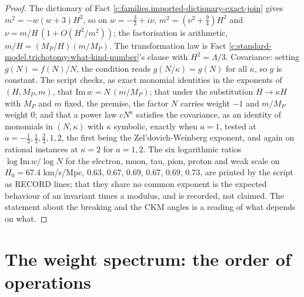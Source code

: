 \documentclass[11pt]{article}
\theoremstyle{definition}
\theoremstyle{plain}
\begin{document}
\begin{proof}
The dictionary of Fact \ref{c:families.imported-dictionary-exact-join} gives $m^{2} = -w(w+3)H^{2}$, so on $w = -\tfrac32 + i\nu$, $m^{2} = (\nu^{2} + \tfrac94)H^{2}$ and $\nu = m/H\,(1 + O(H^{2}/m^{2}))$; the factorisation is arithmetic, $m/H = (M_{P}/H)(m/M_{P})$. The transformation law is Fact \ref{c:standard-model.trichotomy-what-kind-number}'s clause with $H^{2} = \Lambda/3$. Covariance: setting $g(N) = f(N)/N$, the condition reads $g(N/\kappa) = g(N)$ for all $\kappa$, so $g$ is constant. The script checks, as exact monomial identities in the exponents of $(H, M_{P}, m)$, that $\mathrm{Im}\,w = N\,(m/M_{P})$; that under the substitution $H \to \kappa H$ with $M_{P}$ and $m$ fixed, the premise, the factor $N$ carries weight $-1$ and $m/M_{P}$ weight $0$; and that a power law $cN^{a}$ satisfies the covariance, as an identity of monomials in $(N, \kappa)$ with $\kappa$ symbolic, exactly when $a = 1$, tested at $a = -\tfrac13, \tfrac13, \tfrac23, 1, 2$, the first being the Zel'dovich-Weinberg exponent, and again on rational instances at $\kappa = 2$ for $a = 1, 2$. The six logarithmic ratios $\log\mathrm{Im}\,w/\log N$ for the electron, muon, tau, pion, proton and weak scale on $H_{0} = 67.4$ km/s/Mpc, $0.63$, $0.67$, $0.69$, $0.67$, $0.69$, $0.73$, are printed by the script as RECORD lines; that they share no common exponent is the expected behaviour of an invariant times a modulus, and is recorded, not claimed. The statement about the breaking and the CKM angles is a reading of what depends on what.

\end{proof}

\section{The weight spectrum: the order of operations}
\end{document}
